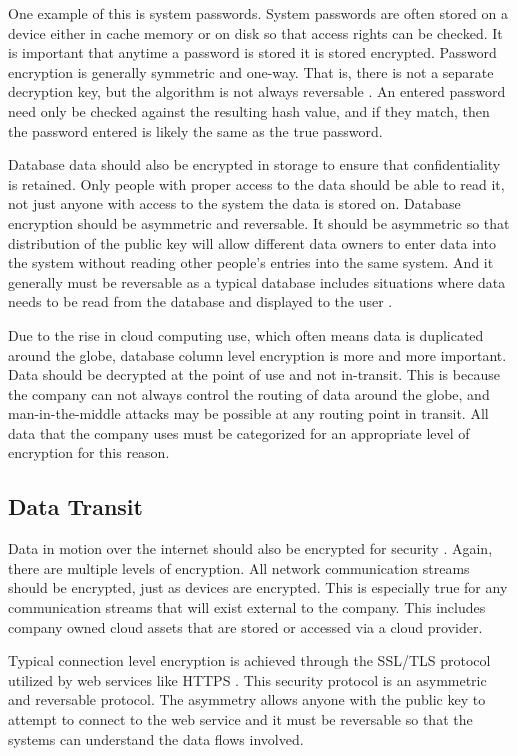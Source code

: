 One example of this is system passwords. System passwords are often stored on a device either in cache memory or on disk so that access rights can be checked. It is important that anytime a password is stored it is stored encrypted. Password encryption is generally symmetric and one-way. That is, there is not a separate decryption key, but the algorithm is not always reversable \parencite{tldpPasswordSecurityEncryption2021}. An entered password need only be checked against the resulting hash value, and if they match, then the password entered is likely the same as the true password.

Database data should also be encrypted in storage to ensure that confidentiality is retained. Only people with proper access to the data should be able to read it, not just anyone with access to the system the data is stored on. Database encryption should be asymmetric and reversable. It should be asymmetric so that distribution of the public key will allow different data owners to enter data into the system without reading other people's entries into the same system. And it generally must be reversable as a typical database includes situations where data needs to be read from the database and displayed to the user \parencite{netlibsecurityDifferencesWholeDatabase2016}.

Due to the rise in cloud computing use, which often means data is duplicated around the globe, database column level encryption is more and more important. Data should be decrypted at the point of use and not in-transit. This is because the company can not always control the routing of data around the globe, and man-in-the-middle attacks may be possible at any routing point in transit. All data that the company uses must be categorized for an appropriate level of encryption for this reason.

\subsection{Data Transit}

Data in motion over the internet should also be encrypted for security \parencite{bahriPrivacyWebService2018}. Again, there are multiple levels of encryption. All network communication streams should be encrypted, just as devices are encrypted. This is especially true for any communication streams that will exist external to the company. This includes company owned cloud assets that are stored or accessed via a cloud provider.

Typical connection level encryption is achieved through the SSL/TLS protocol utilized by web services like HTTPS \parencite{oltsikNetworkEncryptionIts2015}. This security protocol is an asymmetric and reversable protocol. The asymmetry allows anyone with the public key to attempt to connect to the web service and it must be reversable so that the systems can understand the data flows involved.

